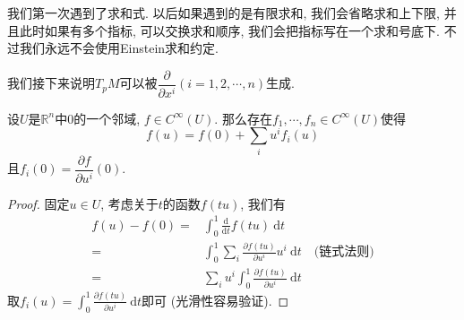 \begin{sym}
    我们第一次遇到了求和式.
    以后如果遇到的是有限求和, 我们会省略求和上下限, 并且此时如果有多个指标, 可以交换求和顺序, 我们会把指标写在一个求和号底下.
    不过我们永远不会使用Einstein求和约定.
\end{sym}

我们接下来说明$T_pM$可以被$\dfrac{\partial}{\partial x^i}(i=1,2,\cdots,n)$生成.

\begin{lem}\label{locally homogeneous}
    设$U$是$\mathbb{R}^n$中$0$的一个邻域, $f\in C^\infty(U)$.
    那么存在$f_1,\cdots,f_n\in C^\infty(U)$使得
    \[f(u)=f(0)+\sum_iu^if_i(u)\]
    且$f_i(0)=\dfrac{\partial f}{\partial u^i}(0)$.
\end{lem}
\begin{proof}
    固定$u\in U$, 考虑关于$t$的函数$f(tu)$, 我们有
    \begin{align*}
        f(u)-f(0)=&\int_0^1\frac{\mathrm{d}}{\mathrm{d}{t}}f(tu)\ \mathrm{d}{t}\\
        =&\int_0^1\sum_{i}\frac{\partial f(tu)}{\partial u^i}u^i\ \mathrm{d}{t}\quad\text{(链式法则)}\\
        =&\sum_iu^i\int_0^1\frac{\partial f(tu)}{\partial u^i}\ \mathrm{d}{t}
    \end{align*}
    取$\displaystyle f_i(u)=\int_0^1\frac{\partial f(tu)}{\partial u^i}\ \mathrm{d}{t}$即可 (光滑性容易验证).
\end{proof}

